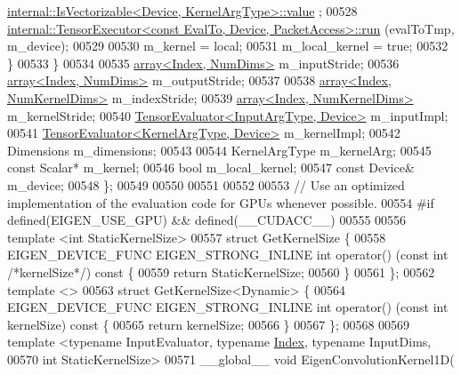 \begin{DoxyCode}
      \hyperlink{struct_eigen_1_1internal_1_1_is_vectorizable}{internal::IsVectorizable<Device, KernelArgType>::value}
      ;
00528       \hyperlink{class_eigen_1_1internal_1_1_tensor_executor}{internal::TensorExecutor<const EvalTo, Device, PacketAccess>::run}
      (evalToTmp, m\_device);
00529 
00530       m\_kernel = local;
00531       m\_local\_kernel = \textcolor{keyword}{true};
00532     \}
00533   \}
00534 
00535   \hyperlink{class_eigen_1_1array}{array<Index, NumDims>} m\_inputStride;
00536   \hyperlink{class_eigen_1_1array}{array<Index, NumDims>} m\_outputStride;
00537 
00538   \hyperlink{class_eigen_1_1array}{array<Index, NumKernelDims>} m\_indexStride;
00539   \hyperlink{class_eigen_1_1array}{array<Index, NumKernelDims>} m\_kernelStride;
00540   \hyperlink{struct_eigen_1_1_tensor_evaluator}{TensorEvaluator<InputArgType, Device>} m\_inputImpl;
00541   \hyperlink{struct_eigen_1_1_tensor_evaluator}{TensorEvaluator<KernelArgType, Device>} m\_kernelImpl;
00542   Dimensions m\_dimensions;
00543 
00544   KernelArgType m\_kernelArg;
00545   \textcolor{keyword}{const} Scalar* m\_kernel;
00546   \textcolor{keywordtype}{bool} m\_local\_kernel;
00547   \textcolor{keyword}{const} Device& m\_device;
00548 \};
00549 
00550 
00551 
00552 
00553 \textcolor{comment}{// Use an optimized implementation of the evaluation code for GPUs whenever possible.}
00554 \textcolor{preprocessor}{#if defined(EIGEN\_USE\_GPU) && defined(\_\_CUDACC\_\_)}
00555 
00556 \textcolor{keyword}{template} <\textcolor{keywordtype}{int} StaticKernelSize>
00557 \textcolor{keyword}{struct }GetKernelSize \{
00558   EIGEN\_DEVICE\_FUNC EIGEN\_STRONG\_INLINE \textcolor{keywordtype}{int} operator() (\textcolor{keyword}{const} \textcolor{keywordtype}{int} \textcolor{comment}{/*kernelSize*/})\textcolor{keyword}{ const }\{
00559     \textcolor{keywordflow}{return} StaticKernelSize;
00560   \}
00561 \};
00562 \textcolor{keyword}{template} <>
00563 \textcolor{keyword}{struct }GetKernelSize<Dynamic> \{
00564   EIGEN\_DEVICE\_FUNC EIGEN\_STRONG\_INLINE \textcolor{keywordtype}{int} operator() (\textcolor{keyword}{const} \textcolor{keywordtype}{int} kernelSize)\textcolor{keyword}{ const }\{
00565     \textcolor{keywordflow}{return} kernelSize;
00566   \}
00567 \};
00568 
00569 \textcolor{keyword}{template} <\textcolor{keyword}{typename} InputEvaluator, \textcolor{keyword}{typename} \hyperlink{namespace_eigen_a62e77e0933482dafde8fe197d9a2cfde}{Index}, \textcolor{keyword}{typename} InputDims,
00570           \textcolor{keywordtype}{int} StaticKernelSize>
00571 \_\_global\_\_ \textcolor{keywordtype}{void} EigenConvolutionKernel1D(

\end{DoxyCode}
